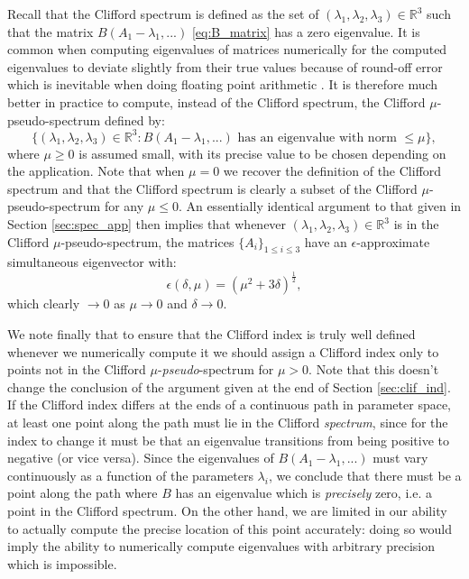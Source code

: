 \documentclass[a4paper]{article}
\begin{document}
Recall that the Clifford spectrum is defined as the set of $(\lambda_1,\lambda_2,\lambda_3) \in \mathbb{R}^3$ such that the matrix $B(A_1 - \lambda_1,...)$ \eqref{eq:B_matrix} has a zero eigenvalue. It is common when computing eigenvalues of matrices numerically for the computed eigenvalues to deviate slightly from their true values because of round-off error which is inevitable when doing floating point arithmetic \cite{TrefethenBau}. It is therefore much better in practice to compute, instead of the Clifford spectrum, the {Clifford $\mu$-pseudo-spectrum} defined by: 
\begin{equation}
	\{ (\lambda_1, \lambda_2, \lambda_3) \in \mathbb{R}^3 : B(A_1 - \lambda_1,...) \text{ has an eigenvalue with norm $\leq \mu$} \},
\end{equation}
where $\mu \geq 0$ is assumed small, with its precise value to be chosen depending on the application. Note that when $\mu = 0$ we recover the definition of the Clifford spectrum and that the Clifford spectrum is clearly a subset of the Clifford $\mu$-pseudo-spectrum for any $\mu \leq 0$. An essentially identical argument to that given in Section \ref{sec:spec_app} then implies that whenever $(\lambda_1, \lambda_2, \lambda_3) \in \mathbb{R}^3$ is in the Clifford $\mu$-pseudo-spectrum, the matrices $\{ A_i \}_{1 \leq i \leq 3}$ have an $\epsilon$-approximate simultaneous eigenvector with:
\begin{equation}
	\epsilon(\delta,\mu) = \left( \mu^2 + 3 \delta \right)^{\frac{1}{2}},
\end{equation}
which clearly $\rightarrow 0$ as $\mu \rightarrow 0$ and $\delta \rightarrow 0$. 

We note finally that to ensure that the Clifford index is truly well defined whenever we numerically compute it we should assign a Clifford index only to points not in the Clifford $\mu$-\emph{pseudo}-spectrum for $\mu > 0$. Note that this doesn't change the conclusion of the argument given at the end of Section \ref{sec:clif_ind}. If the Clifford index differs at the ends of a continuous path in parameter space, at least one point along the path must lie in the Clifford \emph{spectrum}, since for the index to change it must be that an eigenvalue transitions from being positive to negative (or vice versa). Since the eigenvalues of $B(A_1 - \lambda_1,...)$ must vary continuously as a function of the parameters $\lambda_i$, we conclude that there must be a point along the path where $B$ has an eigenvalue which is \emph{precisely} zero, i.e. a point in the Clifford spectrum. On the other hand, we are limited in our ability to actually compute the precise location of this point accurately: doing so would imply the ability to numerically compute eigenvalues with arbitrary precision which is impossible. 
\end{document}
